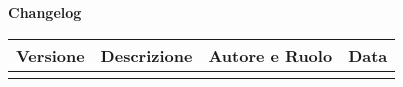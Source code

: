 \newpage
\begin{center}
	\Large{\textbf{Changelog}}
	\\\vspace{0.5cm}
	\normalsize
	\begin{tabularx}{\textwidth}{cXcc}
		\textbf{Versione} & \textbf{Descrizione} & \textbf{Autore e Ruolo} & \textbf{Data}
		\\\toprule
		\modifiche
		\bottomrule
	\end{tabularx}
\end{center}
